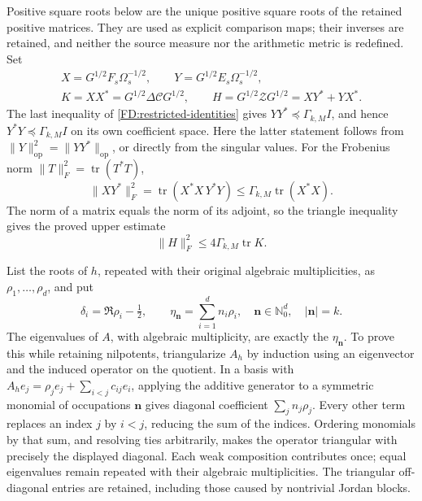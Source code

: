 Positive square roots below are the unique positive square roots of the
retained positive matrices.  They are used as explicit comparison maps;
their inverses are retained, and neither the source measure nor the
arithmetic metric is redefined.  Set
\begin{equation}
\begin{gathered}
X=G^{1/2}F_s\Omega_s^{-1/2},\qquad
Y=G^{1/2}E_s\Omega_s^{-1/2},\\
K=XX^*=G^{1/2}\Delta\mathcal C G^{1/2},\qquad
H=G^{1/2}\mathcal ZG^{1/2}=XY^*+YX^*.
\end{gathered}
\tag{FD.28}\label{FD:comparison-maps}
\end{equation}
The last inequality of \eqref{FD:restricted-identities} gives
\(YY^*\preceq\Gamma_{k,M}I\), and hence
\(Y^*Y\preceq\Gamma_{k,M}I\) on its own coefficient space.  Here the
latter statement follows from \(\|Y\|_{\mathrm{op}}^2
=\|YY^*\|_{\mathrm{op}}\), or directly from the singular values.
For the Frobenius norm \(\|T\|_F^2=\operatorname{tr}(T^*T)\),
\[
\|XY^*\|_F^2
=\operatorname{tr}(X^*X\,Y^*Y)
\le\Gamma_{k,M}\operatorname{tr}(X^*X).
\]
The norm of a matrix equals the norm of its adjoint, so the triangle
inequality gives the proved upper estimate
\begin{equation}
\|H\|_F^2\le4\Gamma_{k,M}\operatorname{tr}K.
\tag{FD.29}\label{FD:Frobenius-upper}
\end{equation}

List the roots of \(h\), repeated with their original algebraic
multiplicities, as \(\rho_1,\ldots,\rho_d\), and put
\begin{equation}
\delta_i=\Re\rho_i-\tfrac12,\qquad
\eta_{\mathbf n}=\sum_{i=1}^dn_i\rho_i,
\quad \mathbf n\in\mathbb N_0^d,\quad |\mathbf n|=k.
\tag{FD.30}\label{FD:spectral-positions}
\end{equation}
The eigenvalues of \(A\), with algebraic multiplicity, are exactly the
\(\eta_{\mathbf n}\).  To prove this while retaining nilpotents,
triangularize \(A_h\) by induction using an eigenvector and the induced
operator on the quotient.  In a basis with
\(A_he_j=\rho_je_j+\sum_{i<j}c_{ij}e_i\), applying the additive
generator to a symmetric monomial of occupations \(\mathbf n\) gives
diagonal coefficient \(\sum_jn_j\rho_j\).  Every other term replaces
an index \(j\) by \(i<j\), reducing the sum of the indices.  Ordering
monomials by that sum, and resolving ties arbitrarily, makes the
operator triangular with precisely the displayed diagonal.  Each weak
composition contributes once; equal eigenvalues remain repeated with
their algebraic multiplicities.  The triangular off-diagonal entries
are retained, including those caused by nontrivial Jordan blocks.

